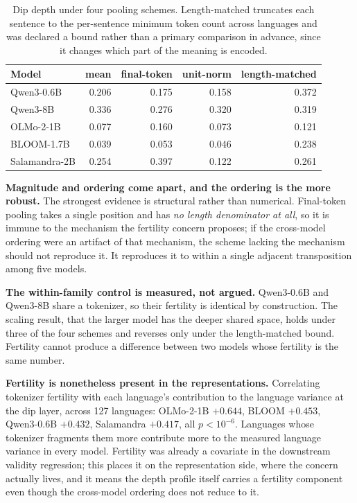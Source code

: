 \documentclass[11pt,a4paper]{article}
\begin{document}
\begin{table}[H]
\centering
\small
\caption{Dip depth under four pooling schemes. Length-matched truncates each
sentence to the per-sentence minimum token count across languages and was
declared a bound rather than a primary comparison in advance, since it
changes which part of the meaning is encoded.}
\begin{tabular}{lrrrr}
\toprule
Model & mean & final-token & unit-norm & length-matched \\
\midrule
Qwen3-0.6B & 0.206 & 0.175 & 0.158 & 0.372 \\
Qwen3-8B & 0.336 & 0.276 & 0.320 & 0.319 \\
OLMo-2-1B & 0.077 & 0.160 & 0.073 & 0.121 \\
BLOOM-1.7B & 0.039 & 0.053 & 0.046 & 0.238 \\
Salamandra-2B & 0.254 & 0.397 & 0.122 & 0.261 \\
\bottomrule
\end{tabular}
\end{table}

\textbf{Magnitude and ordering come apart, and the ordering is the more
robust.} The strongest evidence is structural rather than numerical.
Final-token pooling takes a single position and has \emph{no length
denominator at all}, so it is immune to the mechanism the fertility concern
proposes; if the cross-model ordering were an artifact of that mechanism,
the scheme lacking the mechanism should not reproduce it. It reproduces it
to within a single adjacent transposition among five models.

\textbf{The within-family control is measured, not argued.} Qwen3-0.6B and
Qwen3-8B share a tokenizer, so their fertility is identical by construction.
The scaling result, that the larger model has the deeper shared space, holds
under three of the four schemes and reverses only under the length-matched
bound. Fertility cannot produce a difference between two models whose
fertility is the same number.

\textbf{Fertility is nonetheless present in the representations.}
Correlating tokenizer fertility with each language's contribution to the
language variance at the dip layer, across 127 languages: OLMo-2-1B
$+0.644$, BLOOM $+0.453$, Qwen3-0.6B $+0.432$, Salamandra $+0.417$, all
$p < 10^{-6}$. Languages whose tokenizer fragments them more contribute more
to the measured language variance in every model. Fertility was already a
covariate in the downstream validity regression; this places it on the
representation side, where the concern actually lives, and it means the
depth profile itself carries a fertility component even though the cross-model
ordering does not reduce to it.
\end{document}

